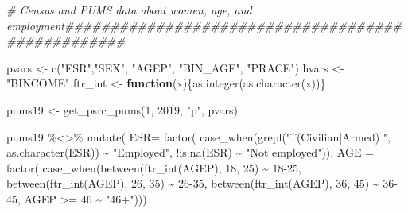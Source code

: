 \documentclass[
  12pt,
]{article}
\newenvironment{Shaded}{\begin{snugshade}}{\end{snugshade}}
\newcommand{\AttributeTok}[1]{\textcolor[rgb]{0.77,0.63,0.00}{#1}}
\newcommand{\CommentTok}[1]{\textcolor[rgb]{0.56,0.35,0.01}{\textit{#1}}}
\newcommand{\ControlFlowTok}[1]{\textcolor[rgb]{0.13,0.29,0.53}{\textbf{#1}}}
\newcommand{\DecValTok}[1]{\textcolor[rgb]{0.00,0.00,0.81}{#1}}
\newcommand{\FunctionTok}[1]{\textcolor[rgb]{0.00,0.00,0.00}{#1}}
\newcommand{\NormalTok}[1]{#1}
\newcommand{\OtherTok}[1]{\textcolor[rgb]{0.56,0.35,0.01}{#1}}
\newcommand{\SpecialCharTok}[1]{\textcolor[rgb]{0.00,0.00,0.00}{#1}}
\newcommand{\StringTok}[1]{\textcolor[rgb]{0.31,0.60,0.02}{#1}}
\begin{document}
\begin{Shaded}
\begin{Highlighting}[]
\CommentTok{\# Census and PUMS data about women, age, and employment\#\#\#\#\#\#\#\#\#\#\#\#\#\#\#\#\#\#\#\#\#\#\#\#\#\#\#\#\#\#\#\#\#\#\#\#\#\#\#\#\#\#\#\#\#\#\#\#\#\#}

\NormalTok{pvars }\OtherTok{\textless{}{-}} \FunctionTok{c}\NormalTok{(}\StringTok{"ESR"}\NormalTok{,}\StringTok{"SEX"}\NormalTok{, }\StringTok{"AGEP"}\NormalTok{, }\StringTok{"BIN\_AGE"}\NormalTok{, }\StringTok{"PRACE"}\NormalTok{)}
\NormalTok{hvars }\OtherTok{\textless{}{-}} \StringTok{"BINCOME"}
\NormalTok{ftr\_int }\OtherTok{\textless{}{-}} \ControlFlowTok{function}\NormalTok{(x)\{}\FunctionTok{as.integer}\NormalTok{(}\FunctionTok{as.character}\NormalTok{(x))\} }

\NormalTok{pums19 }\OtherTok{\textless{}{-}} \FunctionTok{get\_psrc\_pums}\NormalTok{(}\DecValTok{1}\NormalTok{, }\DecValTok{2019}\NormalTok{, }\StringTok{"p"}\NormalTok{, pvars) }

\NormalTok{pums19 }\SpecialCharTok{\%\textless{}\textgreater{}\%} \FunctionTok{mutate}\NormalTok{(}
  \AttributeTok{ESR=} \FunctionTok{factor}\NormalTok{(}
    \FunctionTok{case\_when}\NormalTok{(}\FunctionTok{grepl}\NormalTok{(}\StringTok{"\^{}(Civilian|Armed) "}\NormalTok{, }\FunctionTok{as.character}\NormalTok{(ESR)) }\SpecialCharTok{\textasciitilde{}} \StringTok{"Employed"}\NormalTok{,}
              \SpecialCharTok{!}\FunctionTok{is.na}\NormalTok{(ESR) }\SpecialCharTok{\textasciitilde{}} \StringTok{"Not employed"}\NormalTok{)),}
  \AttributeTok{AGE =} \FunctionTok{factor}\NormalTok{(}
    \FunctionTok{case\_when}\NormalTok{(}\FunctionTok{between}\NormalTok{(}\FunctionTok{ftr\_int}\NormalTok{(AGEP), }\DecValTok{18}\NormalTok{, }\DecValTok{25}\NormalTok{) }\SpecialCharTok{\textasciitilde{}} \StringTok{\textquotesingle{}18{-}25\textquotesingle{}}\NormalTok{,}
              \FunctionTok{between}\NormalTok{(}\FunctionTok{ftr\_int}\NormalTok{(AGEP), }\DecValTok{26}\NormalTok{, }\DecValTok{35}\NormalTok{) }\SpecialCharTok{\textasciitilde{}} \StringTok{\textquotesingle{}26{-}35\textquotesingle{}}\NormalTok{,}
              \FunctionTok{between}\NormalTok{(}\FunctionTok{ftr\_int}\NormalTok{(AGEP), }\DecValTok{36}\NormalTok{, }\DecValTok{45}\NormalTok{) }\SpecialCharTok{\textasciitilde{}} \StringTok{\textquotesingle{}36{-}45\textquotesingle{}}\NormalTok{,}
\NormalTok{              AGEP }\SpecialCharTok{\textgreater{}=} \DecValTok{46} \SpecialCharTok{\textasciitilde{}} \StringTok{"46+"}\NormalTok{)))}


\end{Highlighting}
\end{Shaded}
\end{document}

